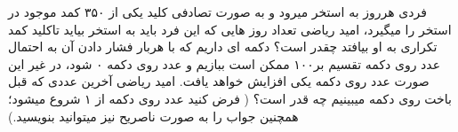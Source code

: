 \problem{}
\subproblem
فردی هرروز به استخر میرود و به صورت تصادفی کلید یکی از ۳۵۰ کمد موجود در استخر را میگیرد، امید ریاضی تعداد روز هایی که این فرد باید به استخر بیاید تاکلید کمد تکراری به او بیافتد چقدر است؟
\newline
\newline
\subproblem
دکمه ای داریم که با هربار فشار دادن آن به احتمال عدد روی دکمه تقسیم بر۱۰۰ ممکن است ببازیم و عدد روی دکمه ۰ شود، در غیر این صورت عدد روی دکمه یکی افزایش خواهد یافت.
امید ریاضی آخرین عددی که قبل باخت روی دکمه میبینیم چه قدر است؟
( فرض کنید عدد روی دکمه از ۱ شروع میشود؛ همچنین جواب را به صورت ناصریح نیز میتوانید بنویسید.)
